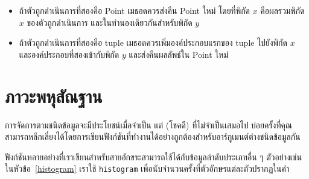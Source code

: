 \begin{itemize}


\item  ถ้าตัวถูกดำเนินการที่สองคือ Point เมธอดควรส่งคืน Point ใหม่ โดยที่พิกัด $x$ คือผลรวมพิกัด $x$ ของตัวถูกดำเนินการ และในทำนองเดียวกันสำหรับพิกัด $y$


\item  ถ้าตัวถูกดำเนินการที่สองคือ tuple เมธอดควรเพิ่มองค์ประกอบแรกของ tuple ไปยังพิกัด $x$ และองค์ประกอบที่สองเข้ากับพิกัด $y$ และส่งคืนผลลัพธ์ใน Point ใหม่

\end{itemize}




\section{ภาวะพหุสัณฐาน} %
\label{polymorphism}


การจัดการตามชนิดข้อมูลจะมีประโยชน์เมื่อจำเป็น แต่ (โชคดี) ที่ไม่จำเป็นเสมอไป 
บ่อยครั้งที่คุณสามารถหลีกเลี่ยงได้โดยการเขียนฟังก์ชันที่ทำงานได้อย่างถูกต้องสำหรับอาร์กูเมนต์ต่างชนิดข้อมูลกัน



ฟังก์ชันหลายอย่างที่เราเขียนสำหรับสายอักขระสามารถใช้ได้กับข้อมูลลำดับประเภทอื่น ๆ 
ตัวอย่างเช่นในหัวข้อ~\ref{histogram} เราใช้ {\tt histogram} เพื่อนับจำนวนครั้งที่ตัวอักษรแต่ละตัวปรากฏในคำ


